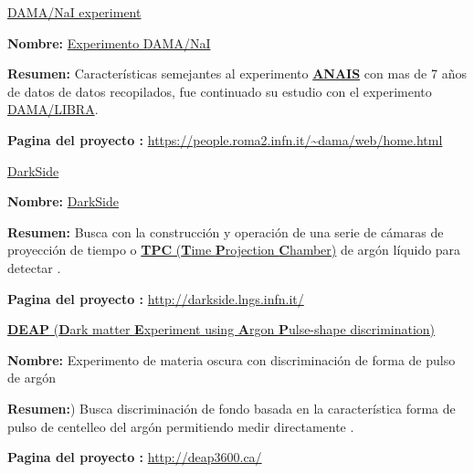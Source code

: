 \begin{itemize_f}
\item[-] \href{https://en.wikipedia.org/wiki/DAMA/NaI}{DAMA/NaI experiment}
\begin{itemize_f}
\item \textbf{Nombre:} \href{https://en.wikipedia.org/wiki/DAMA/NaI}{Experimento DAMA/NaI}
\item \textbf{Resumen:} Características semejantes al experimento \href{https://en.wikipedia.org/wiki/ANAIS}{\textbf{ANAIS}} con mas de 7 años de datos de datos recopilados, fue continuado su estudio con el experimento \href{https://en.wikipedia.org/wiki/DAMA/LIBRA}{DAMA/LIBRA}.
\item \textbf{Pagina del proyecto :} \url{https://people.roma2.infn.it/~dama/web/home.html}
\end{itemize_f}

\item[-] \href{https://en.wikipedia.org/wiki/DarkSide}{DarkSide}
\begin{itemize_f}
\item \textbf{Nombre:} \href{https://en.wikipedia.org/wiki/DarkSide}{DarkSide}
\item \textbf{Resumen:} Busca con la construcción y operación de una serie de cámaras de proyección de tiempo o \href{https://en.wikipedia.org/wiki/Time_projection_chamber}{\textbf{TPC} (\textbf{T}ime \textbf{P}rojection \textbf{C}hamber)} de argón líquido para detectar \WIMPs. 
\item \textbf{Pagina del proyecto :} \url{http://darkside.lngs.infn.it/}
\end{itemize_f}

\item[-] \href{https://en.wikipedia.org/wiki/DEAP}{\textbf{DEAP} (\textbf{D}ark matter \textbf{E}xperiment using \textbf{A}rgon \textbf{P}ulse-shape discrimination)}
\begin{itemize_f}
\item \textbf{Nombre:} Experimento de materia oscura con discriminación de forma de pulso de argón
\item \textbf{Resumen:}) Busca discriminación de fondo basada en la característica forma de pulso de centelleo del argón permitiendo medir directamente \WIMP.
\item \textbf{Pagina del proyecto :} \url{http://deap3600.ca/}
\end{itemize_f}


\end{itemize_f}
